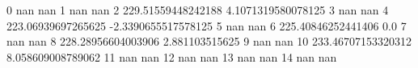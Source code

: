 0 nan nan
1 nan nan
2 229.51559448242188 4.1071319580078125
3 nan nan
4 223.06939697265625 -2.3390655517578125
5 nan nan
6 225.40846252441406 0.0
7 nan nan
8 228.28956604003906 2.881103515625
9 nan nan
10 233.46707153320312 8.058609008789062
11 nan nan
12 nan nan
13 nan nan
14 nan nan
